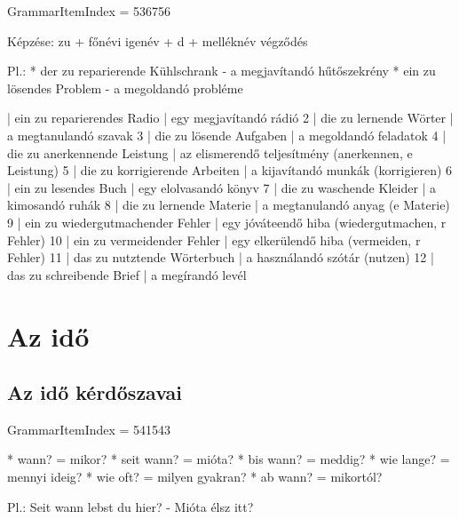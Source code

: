 \documentclass{article}
\newenvironment{desc}{\verbatim}{\endverbatim}
\newenvironment{exmp}{\verbatim}{\endverbatim}
\begin{document}
GrammarItemIndex = 536756

\begin{desc}
Képzése: zu + főnévi igenév + d + melléknév végződés

Pl.: * der zu reparierende Kühlschrank - a megjavítandó hűtőszekrény
* ein zu lösendes Problem - a megoldandó probléme
\end{desc}

\begin{exmp}
1 | ein zu reparierendes Radio | egy megjavítandó rádió
2 | die zu lernende Wörter | a megtanulandó szavak
3 | die zu lösende Aufgaben | a megoldandó feladatok
4 | die zu anerkennende Leistung | az elismerendő teljesítmény (anerkennen, e Leistung)
5 | die zu korrigierende Arbeiten | a kijavítandó munkák (korrigieren)
6 | ein zu lesendes Buch | egy elolvasandó könyv
7 | die zu waschende Kleider | a kimosandó ruhák
8 | die zu lernende Materie | a megtanulandó anyag (e Materie)
9 | ein zu wiedergutmachender Fehler | egy jóváteendő hiba (wiedergutmachen, r Fehler)
10 | ein zu vermeidender Fehler | egy elkerülendő hiba (vermeiden, r Fehler)
11 | das zu nutztende Wörterbuch | a használandó szótár (nutzen)
12 | das zu schreibende Brief | a megírandó levél
\end{exmp}

\section{Az idő}

\subsection{Az idő kérdőszavai}

GrammarItemIndex = 541543

\begin{desc}
* wann? = mikor?
* seit wann? = mióta?
* bis wann? = meddig?
* wie lange? = mennyi ideig?
* wie oft? = milyen gyakran?
* ab wann? = mikortól?

Pl.: Seit wann lebst du hier? - Mióta élsz itt?
\end{desc}
\end{document}
